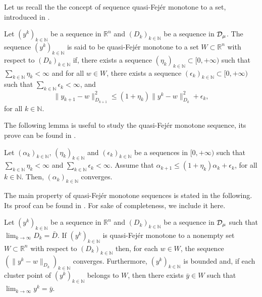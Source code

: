 Let us recall the the concept of  sequence  quasi-Fej\'er  monotone to a set, introduced in  \cite{CombettesVu2013}.
\begin{definition} \label{def:QuasiFejer}
	Let $(y^k)_{k\in\mathbb{N}}$ be a sequence in $\mathbb{R}^n$ and   $(D_k)_{k\in\mathbb{N}}$ be  a sequence in ${\cal D}_{\mu}$.  The sequence $(y^k)_{k\in\mathbb{N}}$ is said to be quasi-Fej\'er  monotone to a set $W\subset \mathbb{R}^n$ with respect to  $(D_k)_{k\in\mathbb{N}}$ if, there exists  a sequence $(\eta_k)_{k\in\mathbb{N}}\subset [0, +\infty)$ such that $\sum_{k\in \mathbb{N}}\eta_k<\infty$ and for  all $w\in W$, there exists a sequence $(\epsilon_k)_{k\in\mathbb{N}}\subset[0, +\infty)$ such that  $\sum_{k\in \mathbb{N}}\epsilon_k<\infty$, and
	\[
		\|y_{k+1}-w\|_{D_{k+1}}^2\leq (1+\eta_k) \|y^k-w\|_{D_k}^2+\epsilon_k,
	\]
	for    all $k\in \mathbb{N}$.
\end{definition}

The following lemma is useful to study the  quasi-Fej\'er  monotone sequence, its prove can be found in \cite[Lemma 2.2.2]{PolyakLivro1987}.
\begin{lemma} \label{le:pl}
	Let $(\alpha_k)_{k\in\mathbb{N}}$, $(\eta_k)_{k\in\mathbb{N}}$ and $(\epsilon_k)_{k\in\mathbb{N}}$ be a sequences in $[0, +\infty)$  such that $\sum_{k\in \mathbb{N}}\eta_k<\infty$ and $\sum_{k\in \mathbb{N}}\epsilon_k<\infty$. Assume that $\alpha_{k+1}\leq (1 +\eta_k)\alpha_k+\epsilon_k$, for all $k\in {\mathbb N}$. Then, $(\alpha_k)_{k\in\mathbb{N}}$ converges.
\end{lemma}

The main property of  quasi-Fej\'er  monotone sequences is stated in the following. Its proof can be found in \cite[Proposition~3.2 and Theorem 3.3]{CombettesVu2013}. For sake of completeness, we include it here.

\begin{theorem}\label{teo.qf}
	Let $(y^k)_{k\in\mathbb{N}}$ be a sequence in $\mathbb{R}^n$ and   $(D_k)_{k\in\mathbb{N}}$ be  a sequence in ${\cal D}_{\mu}$ such that $\lim_{k\rightarrow\infty}D_k={\bar D}$.   If $(y^k)_{k\in\mathbb{N}}$ is quasi-Fej\'er  monotone to a nonempty set $W\subset  \mathbb{R}^n$ with respect to $(D_k)_{k\in\mathbb{N}}$ then,  for each  $w\in W$,    the sequence  $(\|y^{k}-w\|_{D_{k}})_{k\in\mathbb{N}}$ converges. Furthermore, $(y^k)_{k\in\mathbb{N}}$ is bounded and, if each  cluster point of $(y^k)_{k\in\mathbb{N}}$ belongs to $W$, then there exists ${\bar y}\in W$ such that $\lim_{k\rightarrow\infty}y^k={\bar y}$.
\end{theorem}

